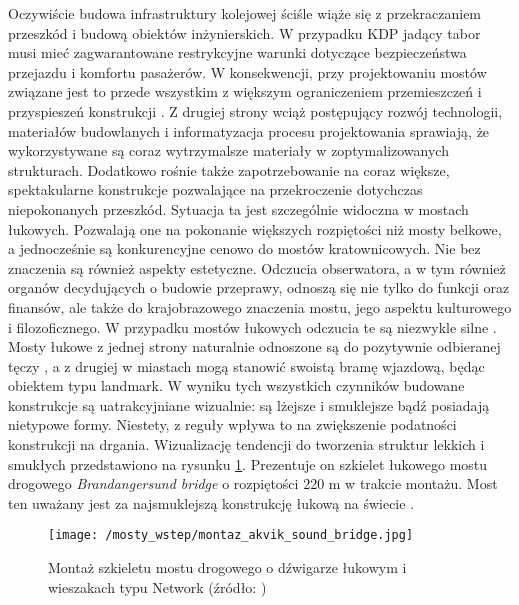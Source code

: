 Oczywiście budowa infrastruktury kolejowej ściśle wiąże się z przekraczaniem przeszkód i budową obiektów inżynierskich. W przypadku KDP jadący tabor musi mieć zagwarantowane restrykcyjne warunki dotyczące bezpieczeństwa przejazdu i komfortu pasażerów. W konsekwencji, przy projektowaniu mostów związane jest to przede wszystkim z większym ograniczeniem przemieszczeń i przyspieszeń konstrukcji \parencite{Niemierko2012}. Z drugiej strony wciąż postępujący rozwój technologii, materiałów budowlanych i informatyzacja procesu projektowania sprawiają, że wykorzystywane są coraz wytrzymalsze materiały w zoptymalizowanych strukturach. Dodatkowo rośnie także zapotrzebowanie na coraz większe, spektakularne konstrukcje pozwalające na przekroczenie dotychczas niepokonanych przeszkód. Sytuacja ta jest szczególnie widoczna w mostach łukowych. Pozwalają one na pokonanie większych rozpiętości niż mosty belkowe, a jednocześnie są konkurencyjne cenowo do mostów kratownicowych. Nie bez znaczenia są również aspekty estetyczne. Odczucia obserwatora, a w tym również organów decydujących o budowie przeprawy, odnoszą się nie tylko do funkcji oraz finansów, ale także do krajobrazowego znaczenia mostu, jego aspektu kulturowego i filozoficznego. W przypadku mostów łukowych odczucia te są niezwykle silne \parencite{Kido_Cywiński_2019,Kido_Cywiński_2021}. Mosty łukowe z jednej strony naturalnie odnoszone są do pozytywnie odbieranej tęczy \parencite{Prandowski1994}, a z drugiej w miastach mogą stanowić swoistą bramę wjazdową, będąc obiektem typu landmark. W wyniku tych wszystkich czynników budowane konstrukcje są uatrakcyjniane wizualnie: są lżejsze i smuklejsze bądź posiadają nietypowe formy. Niestety, z reguły wpływa to na zwiększenie podatności konstrukcji na drgania. Wizualizację tendencji do tworzenia struktur lekkich i smukłych przedstawiono na rysunku \ref{fig:bridges_arch_monatage}. Prezentuje on szkielet łukowego mostu drogowego \textit{Brandangersund bridge} o rozpiętości 220 m w trakcie montażu. Most ten uważany jest za najsmuklejszą konstrukcję łukową na świecie \parencite{Larssen2011}.

\begin{figure}[hbt!]
	\centering
	\texttt{[image: /mosty\_wstep/montaz\_akvik\_sound\_bridge.jpg]}
	\captionsetup{justification=centering}
	\caption{Montaż szkieletu mostu drogowego o dźwigarze łukowym i wieszakach typu Network (źródło: \parencite{Tveit2014})}
	\label{fig:bridges_arch_monatage}
\end{figure}

